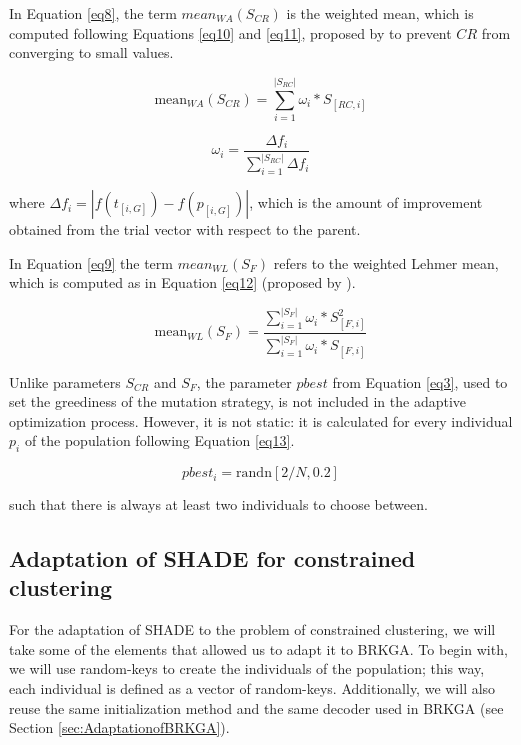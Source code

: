 \documentclass[review]{elsarticle}
\begin{document}
In Equation \ref{eq8}, the term $mean_{WA} (S_{CR})$ is the weighted mean, which is computed following Equations \eqref{eq10} and \eqref{eq11}, proposed by \cite{peng2009multi} to prevent $CR$ from converging to small values.

\begin{equation}
\text{mean}_{WA} (S_{CR}) = \sum_{i = 1}^{|S_{RC}|} \omega_i * S_{[RC,i]}
\label{eq10}
\end{equation}

\begin{equation}
\omega_i = \frac{\Delta f_i}{\sum_{i = 1}^{|S_{RC}|} \Delta f_i}
\label{eq11}
\end{equation}

where $\Delta f_i = |f(t_{[i,G]}) - f(p_{[i, G]})|$, which is the amount of improvement obtained from the trial vector with respect to the parent.

In Equation \ref{eq9} the term $mean_{WL} (S_{F})$ refers to the weighted Lehmer mean, which is computed as in Equation \eqref{eq12} (proposed by \cite{tanabe2013success}).

\begin{equation}
\text{mean}_{WL} (S_{F}) = \frac{\sum_{i = 1}^{|S_{F}|} \omega_i * S^2_{[F,i]}}{\sum_{i = 1}^{|S_{F}|} \omega_i * S_{[F,i]}}
\label{eq12}
\end{equation}

Unlike parameters $S_{CR}$ and $S_F$, the parameter $pbest$ from Equation \eqref{eq3}, used to set the greediness of the mutation strategy, is not included in the adaptive optimization process. However, it is not static: it is calculated for every individual $p_i$ of the population following Equation \eqref{eq13}.

\begin{equation}
pbest_i = \text{randn}[2/N, 0.2]
\label{eq13}
\end{equation}

such that there is always at least two individuals to choose between.

\subsection{Adaptation of SHADE for constrained clustering}

For the adaptation of SHADE to the problem of constrained clustering, we will take some of the elements that allowed us to adapt it to BRKGA. To begin with, we will use random-keys to create the individuals of the population; this way, each individual is defined as a vector of random-keys. Additionally, we will also reuse the same initialization method and the same decoder used in BRKGA (see Section \ref{sec:AdaptationofBRKGA}).
\end{document}
